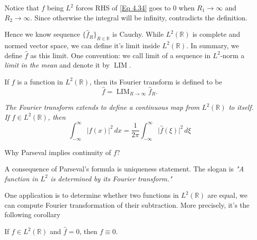 Notice that $f$ being $L^2$ forces RHS of \ref{Eq 4.34} goes to $0$ when $R_1\to\infty$ and $R_2\to\infty$. Since otherwise the integral will be infinity, contradicts the definition.

Hence we know sequence $\{\hat{f}_R\}_{R\in\mathbb R}$ is Cauchy. While $L^2(\mathbb R)$ is complete and normed vector space, we can define it's limit inside $L^2(\mathbb R)$. In summary, we define $\hat{f}$ as this limit. One convention: we call limit of a sequence in $L^2$-norm a \textit{limit in the mean} and denote it by $\operatorname{LIM}$.
\begin{Definition}[Defintion 4.2.5.] 
    If $f$ is a function in $L^2(\mathbb R)$, then its Fourier transform is defined to be 
    \begin{equation*}
\hat{f}=\operatorname{LIM}_{R\to\infty}\hat{f}_R.
    \end{equation*}
\end{Definition}

\begin{Proposition}[Proposition 4.2.5.]

\textit{The Fourier transform extends to define a continuous map from $L^2(\mathbb R)$ to itself. If $f\in L^2(\mathbb R)$, then \begin{equation*}
    \int_{-\infty}^{\infty}\vert f(x)\vert ^2 \,dx=\frac{1}{2\pi}\int_{-\infty}^{\infty}\vert\hat{f}(\xi)\vert^2\,d\xi
\end{equation*}}

\end{Proposition}

\begin{Question}
    Why Parseval implies continuity of $f$?
\end{Question}

A consequence of Parseval's formula is uniqueness statement. The slogan is \textit{"A  function in $L^2$ is determined by its Fourier transform."}

One application is to determine whether two functions in $L^2(\mathbb R)$ are equal, we can compute Fourier transformation of their subtraction. More precisely, it's the following corollary

\begin{coro}
    If $f\in L^2(\mathbb R)$ and $\hat{f}=0$, then $f\equiv 0$.
\end{coro}

\begin{prop}


\end{prop}

